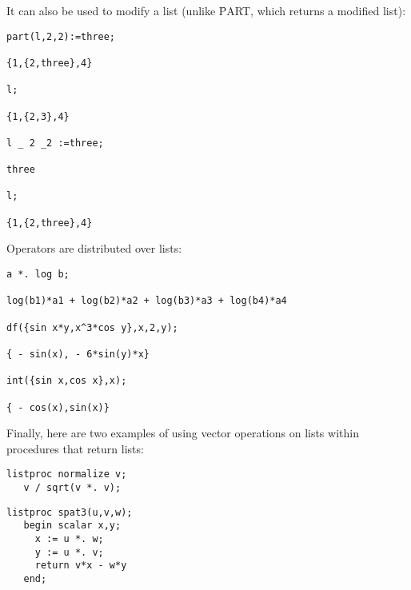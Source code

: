 It can also be used to modify a list (unlike \f{PART}, which returns a modified list):
\begin{verbatim}
part(l,2,2):=three;

{1,{2,three},4}

l;

{1,{2,3},4}

l _ 2 _2 :=three;

three

l;

{1,{2,three},4}
\end{verbatim}
Operators are distributed over lists:
\begin{verbatim}
a *. log b;

log(b1)*a1 + log(b2)*a2 + log(b3)*a3 + log(b4)*a4

df({sin x*y,x^3*cos y},x,2,y);

{ - sin(x), - 6*sin(y)*x}

int({sin x,cos x},x);

{ - cos(x),sin(x)}
\end{verbatim}

Finally, here are two examples of using vector operations on lists
within procedures that return lists:
\begin{verbatim}
listproc normalize v;
   v / sqrt(v *. v);
\end{verbatim}
\begin{verbatim}
listproc spat3(u,v,w);
   begin scalar x,y;
     x := u *. w;
     y := u *. v;
     return v*x - w*y
   end;
\end{verbatim}
